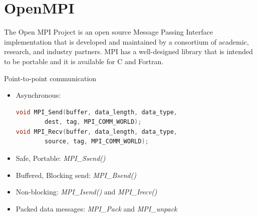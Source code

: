 \documentclass{article}
\begin{document}
\section{OpenMPI}

The Open MPI Project is an open source Message Passing Interface implementation that is developed and maintained by a consortium of academic, research, and industry partners. MPI has a well-designed library that is intended to be portable and it is available for C and Fortran.


Point-to-point communication




\begin{itemize}
    \item Asynchronous:
\begin{lstlisting}[language=C]
void MPI_Send(buffer, data_length, data_type,
        dest, tag, MPI_COMM_WORLD);
void MPI_Recv(buffer, data_length, data_type,
        source, tag, MPI_COMM_WORLD);
\end{lstlisting}

    \item Safe, Portable: \textit{MPI\_Ssend()}
    \item Buffered, Blocking send: \textit{MPI\_Bsend()}
    \item Non-blocking: \textit{MPI\_Isend()} and \textit{MPI\_Irecv()}
    \item Packed data messages: \textit{MPI\_Pack} and \textit{MPI\_unpack}
\end{itemize}
\end{document}
